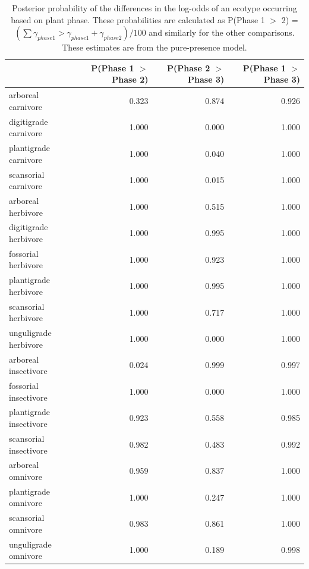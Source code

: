 \begin{table}[ht]
  \centering
  \caption[Posterior probablity estimates of differences in occurrence by plant phase]{Posterior probability of the differences in the log-odds of an ecotype occurring based on plant phase. These probabilities are calculated as P(Phase 1 \(>\) 2) = \( (\sum \gamma_{phase 1} > \gamma_{phase 1} + \gamma_{phase 2}) / 100\) and similarly for the other comparisons. These estimates are from the pure-presence model.}
  \label{tab:occur_plant}
  \begin{tabular}{ l r r r }
    \hline
    & P(Phase 1 $>$ Phase 2) & P(Phase 2 $>$ Phase 3) & P(Phase 1 $>$ Phase 3) \\ 
    \hline
    arboreal carnivore & 0.323 & 0.874 & 0.926 \\ 
    digitigrade carnivore & 1.000 & 0.000 & 1.000 \\ 
    plantigrade carnivore & 1.000 & 0.040 & 1.000 \\ 
    scansorial carnivore & 1.000 & 0.015 & 1.000 \\ 
    arboreal herbivore & 1.000 & 0.515 & 1.000 \\ 
    digitigrade herbivore & 1.000 & 0.995 & 1.000 \\ 
    fossorial herbivore & 1.000 & 0.923 & 1.000 \\ 
    plantigrade herbivore & 1.000 & 0.995 & 1.000 \\ 
    scansorial herbivore & 1.000 & 0.717 & 1.000 \\ 
    unguligrade herbivore & 1.000 & 0.000 & 1.000 \\ 
    arboreal insectivore & 0.024 & 0.999 & 0.997 \\ 
    fossorial insectivore & 1.000 & 0.000 & 1.000 \\ 
    plantigrade insectivore & 0.923 & 0.558 & 0.985 \\ 
    scansorial insectivore & 0.982 & 0.483 & 0.992 \\ 
    arboreal omnivore & 0.959 & 0.837 & 1.000 \\ 
    plantigrade omnivore & 1.000 & 0.247 & 1.000 \\ 
    scansorial omnivore & 0.983 & 0.861 & 1.000 \\ 
    unguligrade omnivore & 1.000 & 0.189 & 0.998 \\ 
    \hline
  \end{tabular}
\end{table}

